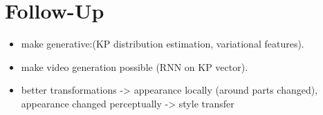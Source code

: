 \section{Follow-Up}
	\begin{itemize}
		\item make generative:(KP distribution estimation, variational features).
		\item make video generation possible (RNN on KP vector).
		\item better transformations -> appearance locally (around parts changed), appearance changed perceptually -> style transfer
	\end{itemize}





